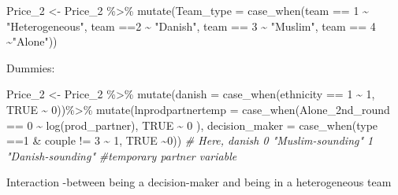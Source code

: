 \documentclass[
]{article}
\newenvironment{Shaded}{\begin{snugshade}}{\end{snugshade}}
\newcommand{\AttributeTok}[1]{\textcolor[rgb]{0.77,0.63,0.00}{#1}}
\newcommand{\CommentTok}[1]{\textcolor[rgb]{0.56,0.35,0.01}{\textit{#1}}}
\newcommand{\ConstantTok}[1]{\textcolor[rgb]{0.00,0.00,0.00}{#1}}
\newcommand{\DecValTok}[1]{\textcolor[rgb]{0.00,0.00,0.81}{#1}}
\newcommand{\FunctionTok}[1]{\textcolor[rgb]{0.00,0.00,0.00}{#1}}
\newcommand{\NormalTok}[1]{#1}
\newcommand{\OtherTok}[1]{\textcolor[rgb]{0.56,0.35,0.01}{#1}}
\newcommand{\SpecialCharTok}[1]{\textcolor[rgb]{0.00,0.00,0.00}{#1}}
\newcommand{\StringTok}[1]{\textcolor[rgb]{0.31,0.60,0.02}{#1}}
\begin{document}
\begin{Shaded}
\begin{Highlighting}[]
\NormalTok{Price\_2 }\OtherTok{\textless{}{-}}\NormalTok{ Price\_2 }\SpecialCharTok{\%\textgreater{}\%}
  \FunctionTok{mutate}\NormalTok{(}\AttributeTok{Team\_type =} \FunctionTok{case\_when}\NormalTok{(team }\SpecialCharTok{==} \DecValTok{1} \SpecialCharTok{\textasciitilde{}} \StringTok{"Heterogeneous"}\NormalTok{, team }\SpecialCharTok{==}\DecValTok{2} \SpecialCharTok{\textasciitilde{}} \StringTok{"Danish"}\NormalTok{,}
\NormalTok{                               team }\SpecialCharTok{==} \DecValTok{3} \SpecialCharTok{\textasciitilde{}} \StringTok{"Muslim"}\NormalTok{, team }\SpecialCharTok{==} \DecValTok{4} \SpecialCharTok{\textasciitilde{}}\StringTok{"Alone"}\NormalTok{))}
\end{Highlighting}
\end{Shaded}

Dummies:

\begin{Shaded}
\begin{Highlighting}[]
\NormalTok{Price\_2 }\OtherTok{\textless{}{-}}\NormalTok{ Price\_2 }\SpecialCharTok{\%\textgreater{}\%}
  \FunctionTok{mutate}\NormalTok{(}\AttributeTok{danish =} \FunctionTok{case\_when}\NormalTok{(ethnicity }\SpecialCharTok{==} \DecValTok{1} \SpecialCharTok{\textasciitilde{}} \DecValTok{1}\NormalTok{, }\ConstantTok{TRUE} \SpecialCharTok{\textasciitilde{}} \DecValTok{0}\NormalTok{))}\SpecialCharTok{\%\textgreater{}\%}
  \FunctionTok{mutate}\NormalTok{(}\AttributeTok{lnprodpartnertemp =} \FunctionTok{case\_when}\NormalTok{(Alone\_2nd\_round }\SpecialCharTok{==} \DecValTok{0} \SpecialCharTok{\textasciitilde{}} \FunctionTok{log}\NormalTok{(prod\_partner),}
                                       \ConstantTok{TRUE} \SpecialCharTok{\textasciitilde{}} \DecValTok{0}\NormalTok{ ),}
         \AttributeTok{decision\_maker =} \FunctionTok{case\_when}\NormalTok{(type }\SpecialCharTok{==}\DecValTok{1} \SpecialCharTok{\&}\NormalTok{ couple }\SpecialCharTok{!=} \DecValTok{3} \SpecialCharTok{\textasciitilde{}} \DecValTok{1}\NormalTok{, }\ConstantTok{TRUE} \SpecialCharTok{\textasciitilde{}}\DecValTok{0}\NormalTok{))}
\CommentTok{\# Here, danish 0 "Muslim{-}sounding" 1 "Danish{-}sounding"}
\CommentTok{\#temporary partner variable}
\end{Highlighting}
\end{Shaded}

Interaction -between being a decision-maker and being in a heterogeneous
team
\end{document}
